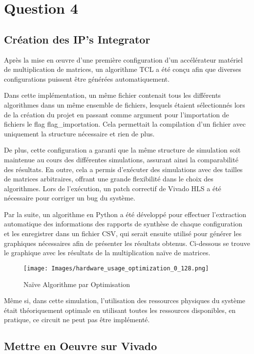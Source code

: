 \documentclass[../CSC_5RO06_TA.tex]{subfiles}
\begin{document}
\section*{Question 4}

\subsection{Création des IP's Integrator}

Après la mise en œuvre d'une première configuration d'un accélérateur matériel de multiplication de matrices, un algorithme TCL a été conçu afin que diverses configurations puissent être générées automatiquement.

Dans cette implémentation, un même fichier contenait tous les différents algorithmes dans un même ensemble de fichiers, lesquels étaient sélectionnés lors de la création du projet en passant comme argument pour l'importation de fichiers le flag flag\_importation. Cela permettait la compilation d'un fichier avec uniquement la structure nécessaire et rien de plus.

De plus, cette configuration a garanti que la même structure de simulation soit maintenue au cours des différentes simulations, assurant ainsi la comparabilité des résultats. En outre, cela a permis d'exécuter des simulations avec des tailles de matrices arbitraires, offrant une grande flexibilité dans le choix des algorithmes. Lors de l'exécution, un patch correctif de Vivado HLS a été nécessaire pour corriger un bug du système.

Par la suite, un algorithme en Python a été développé pour effectuer l'extraction automatique des informations des rapports de synthèse de chaque configuration et les enregistrer dans un fichier CSV, qui serait ensuite utilisé pour générer les graphiques nécessaires afin de présenter les résultats obtenus. Ci-dessous se trouve le graphique avec les résultats de la multiplication naïve de matrices.
\begin{figure}[H]
    \centering
    \texttt{[image: Images/hardware\_usage\_optimization\_0\_128.png]}
    \caption{Naïve Algorithme par Optimisation}
\end{figure}

Même si, dans cette simulation, l'utilisation des ressources physiques du système était théoriquement optimale en utilisant toutes les ressources disponibles, en pratique, ce circuit ne peut pas être implémenté.

\subsection{Mettre en Oeuvre sur Vivado}
\end{document}
